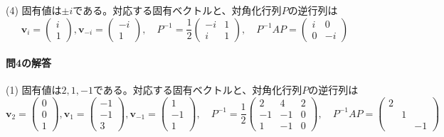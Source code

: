 \noindent (4) 固有値は$\pm i$である。対応する固有ベクトルと、対角化行列$P$の逆行列は
\[
\bm{v}_{i} = 
\begin{pmatrix}
i \\
1
\end{pmatrix}, 
\bm{v}_{-i} = 
\begin{pmatrix}
-i \\
1
\end{pmatrix}, \quad
P^{-1} = 
\frac{1}{2}
\begin{pmatrix}
-i & 1 \\
i & 1
\end{pmatrix}, \quad
P^{-1} AP =
\begin{pmatrix}
i & 0 \\
0 & -i
\end{pmatrix}
\]

\paragraph{問4の解答}
(1) 固有値は$2, 1, -1$である。対応する固有ベクトルと、対角化行列$P$の逆行列は
\[
\bm{v}_{2} = 
\begin{pmatrix}
0 \\
0 \\
1
\end{pmatrix}, 
\bm{v}_{1} = 
\begin{pmatrix}
-1 \\
-1 \\
3
\end{pmatrix}, 
\bm{v}_{-1} = 
\begin{pmatrix}
1 \\
-1 \\
1
\end{pmatrix}, \quad
P^{-1} = 
\frac{1}{2}
\begin{pmatrix}
2 & 4 & 2 \\
-1 & -1 & 0 \\
1 & -1 & 0
\end{pmatrix}, \quad
P^{-1} AP =
\begin{pmatrix}
2 \\
 & 1 \\
 & & -1
\end{pmatrix}
\]

